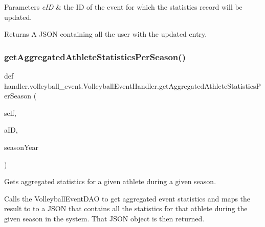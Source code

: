 \begin{DoxyParams}{Parameters}
{\em e\+ID} & the ID of the event for which the statistics record will be updated.\\
\hline
\end{DoxyParams}
\begin{DoxyReturn}{Returns}
A J\+S\+ON containing all the user with the updated entry. 
\end{DoxyReturn}
\mbox{\label{classhandler_1_1volleyball__event_1_1_volleyball_event_handler_ae5eef41ff08e9b80e4b04b05f34e1f79}} 
\subsubsection{\texorpdfstring{get\+Aggregated\+Athlete\+Statistics\+Per\+Season()}{getAggregatedAthleteStatisticsPerSeason()}}
{\footnotesize\ttfamily def handler.\+volleyball\+\_\+event.\+Volleyball\+Event\+Handler.\+get\+Aggregated\+Athlete\+Statistics\+Per\+Season (\begin{DoxyParamCaption}\item[{}]{self,  }\item[{}]{a\+ID,  }\item[{}]{season\+Year }\end{DoxyParamCaption})}



Gets aggregated statistics for a given athlete during a given season. 

Calls the Volleyball\+Event\+D\+AO to get aggregated event statistics and maps the result to to a J\+S\+ON that contains all the statistics for that athlete during the given season in the system. That J\+S\+ON object is then returned.


